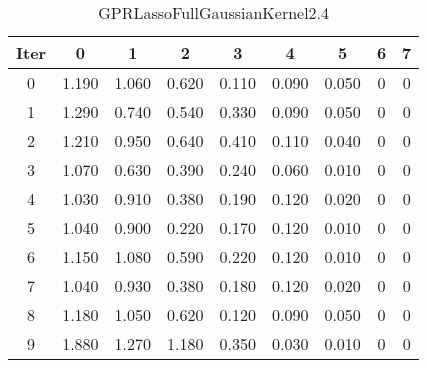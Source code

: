 \begin{table}
	\begin{center}
		\begin{tabular}{|c|c|c|c|c|c|c|c|c|}
			\hline
			Iter & 0 & 1 & 2 & 3 & 4 & 5 & 6 & 7 \\
			\hline
			0 & 1.190 & 1.060 & 0.620 & 0.110 & 0.090 & 0.050 & 0 & 0 \\
			\hline
			1 & 1.290 & 0.740 & 0.540 & 0.330 & 0.090 & 0.050 & 0 & 0 \\
			\hline
			2 & 1.210 & 0.950 & 0.640 & 0.410 & 0.110 & 0.040 & 0 & 0 \\
			\hline
			3 & 1.070 & 0.630 & 0.390 & 0.240 & 0.060 & 0.010 & 0 & 0 \\
			\hline
			4 & 1.030 & 0.910 & 0.380 & 0.190 & 0.120 & 0.020 & 0 & 0 \\
			\hline
			5 & 1.040 & 0.900 & 0.220 & 0.170 & 0.120 & 0.010 & 0 & 0 \\
			\hline
			6 & 1.150 & 1.080 & 0.590 & 0.220 & 0.120 & 0.010 & 0 & 0 \\
			\hline
			7 & 1.040 & 0.930 & 0.380 & 0.180 & 0.120 & 0.020 & 0 & 0 \\
			\hline
			8 & 1.180 & 1.050 & 0.620 & 0.120 & 0.090 & 0.050 & 0 & 0 \\
			\hline
			9 & 1.880 & 1.270 & 1.180 & 0.350 & 0.030 & 0.010 & 0 & 0 \\
			\hline
		\end{tabular}
	\end{center}
	\caption{GPRLassoFullGaussianKernel2.4}
\end{table}